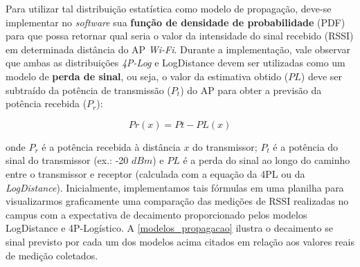 \documentclass[
	12pt,				%
	twoside,			%
	a4paper,			%
	english,			%
	french,				%
	spanish,			%
	brazil				%
	]{abntex2}
\begin{document}
Para utilizar tal distribuição estatística como modelo de propagação,
deve-se implementar no \emph{software} sua \textbf{função de densidade
de probabilidade} (PDF) para que possa retornar qual seria o valor da
intensidade do sinal recebido (RSSI) em determinada distância do AP
\emph{Wi-Fi}. Durante a implementação, vale observar que ambas as
distribuições \emph{4P-Log} e LogDistance devem ser utilizadas como um
modelo de \textbf{perda de sinal}, ou seja, o valor da estimativa obtido
(\(PL\)) deve ser subtraído da potência de transmissão (\(P_{t}\)) do AP
para obter a previsão da potência recebida (\(P_{r}\)):

\begin{equation}
Pr(x) = Pt - PL(x)
\end{equation}

onde \(P_{r}\) é a potência recebida à distância \(x\) do transmissor;
\(P_{t}\) é a potência do sinal do transmissor (ex.: -20 \(dBm\)) e
\(PL\) é a perda do sinal ao longo do caminho entre o transmissor e
receptor (calculada com a equação da 4PL ou da \emph{LogDistance}).
Inicialmente, implementamos tais fórmulas em uma planilha para
visualizarmos graficamente uma comparação das medições de RSSI
realizadas no campus com a expectativa de decaimento proporcionado pelos
modelos LogDistance e 4P-Logístico. A \autoref{modelos_propagacao}
ilustra o decaimento se sinal previsto por cada um dos modelos acima
citados em relação aos valores reais de medição coletados.
\end{document}
